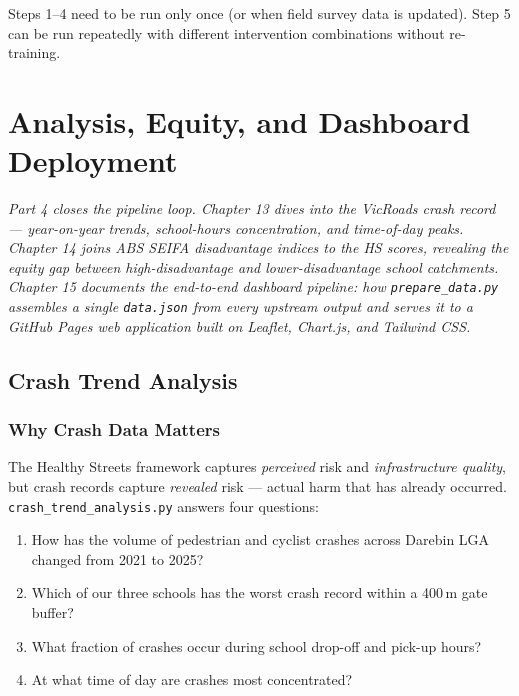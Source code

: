 \documentclass[11pt,a4paper,openany]{book}
\begin{document}
Steps 1--4 need to be run only once (or when field survey data is updated). Step 5 can be run repeatedly with different intervention combinations without re-training.

\part{Analysis, Equity, and Dashboard Deployment}

\begin{center}
\vspace{1cm}
{\large\itshape
Part 4 closes the pipeline loop. Chapter 13 dives into the VicRoads crash record ---
year-on-year trends, school-hours concentration, and time-of-day peaks.
Chapter 14 joins ABS SEIFA disadvantage indices to the HS scores, revealing the
equity gap between high-disadvantage and lower-disadvantage school catchments.
Chapter 15 documents the end-to-end dashboard pipeline: how \texttt{prepare\_data.py}
assembles a single \texttt{data.json} from every upstream output and serves it
to a GitHub Pages web application built on Leaflet, Chart.js, and Tailwind CSS.
}
\vspace{1cm}
\end{center}

\chapter{Crash Trend Analysis}

\section{Why Crash Data Matters}

The Healthy Streets framework captures \emph{perceived} risk and \emph{infrastructure quality},
but crash records capture \emph{revealed} risk --- actual harm that has already occurred.
\texttt{crash\_trend\_analysis.py} answers four questions:

\begin{enumerate}
  \item How has the volume of pedestrian and cyclist crashes across Darebin LGA changed from 2021 to 2025?
  \item Which of our three schools has the worst crash record within a 400\,m gate buffer?
  \item What fraction of crashes occur during school drop-off and pick-up hours?
  \item At what time of day are crashes most concentrated?
\end{enumerate}
\end{document}
